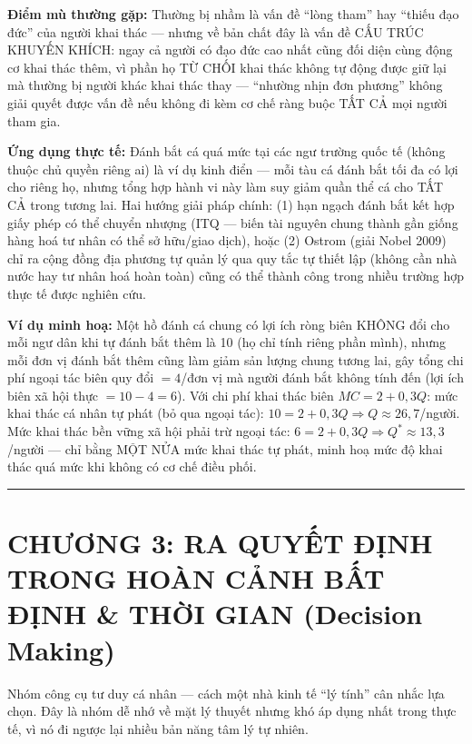 \documentclass[
]{article}
\begin{document}
\textbf{Điểm mù thường gặp:} Thường bị nhầm là vấn đề ``lòng tham'' hay
``thiếu đạo đức'' của người khai thác --- nhưng về bản chất đây là vấn
đề CẤU TRÚC KHUYẾN KHÍCH: ngay cả người có đạo đức cao nhất cũng đối
diện cùng động cơ khai thác thêm, vì phần họ TỪ CHỐI khai thác không tự
động được giữ lại mà thường bị người khác khai thác thay --- ``nhường
nhịn đơn phương'' không giải quyết được vấn đề nếu không đi kèm cơ chế
ràng buộc TẤT CẢ mọi người tham gia.

\textbf{Ứng dụng thực tế:} Đánh bắt cá quá mức tại các ngư trường quốc
tế (không thuộc chủ quyền riêng ai) là ví dụ kinh điển --- mỗi tàu cá
đánh bắt tối đa có lợi cho riêng họ, nhưng tổng hợp hành vi này làm suy
giảm quần thể cá cho TẤT CẢ trong tương lai. Hai hướng giải pháp chính:
(1) hạn ngạch đánh bắt kết hợp giấy phép có thể chuyển nhượng (ITQ ---
biến tài nguyên chung thành gần giống hàng hoá tư nhân có thể sở
hữu/giao dịch), hoặc (2) Ostrom (giải Nobel 2009) chỉ ra cộng đồng địa
phương tự quản lý qua quy tắc tự thiết lập (không cần nhà nước hay tư
nhân hoá hoàn toàn) cũng có thể thành công trong nhiều trường hợp thực
tế được nghiên cứu.

\textbf{Ví dụ minh hoạ:} Một hồ đánh cá chung có lợi ích ròng biên KHÔNG
đổi cho mỗi ngư dân khi tự đánh bắt thêm là 10 (họ chỉ tính riêng phần
mình), nhưng mỗi đơn vị đánh bắt thêm cũng làm giảm sản lượng chung
tương lai, gây tổng chi phí ngoại tác biên quy đổi \(= 4\)/đơn vị mà
người đánh bắt không tính đến (lợi ích biên xã hội thực
\(= 10 - 4 = 6\)). Với chi phí khai thác biên \(MC = 2 + 0{,}3Q\): mức
khai thác cá nhân tự phát (bỏ qua ngoại tác):
\(10 = 2 + 0{,}3Q \Rightarrow Q \approx 26{,}7\)/người. Mức khai thác
bền vững xã hội phải trừ ngoại tác:
\(6 = 2 + 0{,}3Q \Rightarrow Q^* \approx 13{,}3\)/người --- chỉ bằng MỘT
NỬA mức khai thác tự phát, minh hoạ mức độ khai thác quá mức khi không
có cơ chế điều phối.

\begin{center}\rule{0.5\linewidth}{0.5pt}\end{center}

\section{CHƯƠNG 3: RA QUYẾT ĐỊNH TRONG HOÀN CẢNH BẤT ĐỊNH \& THỜI GIAN
(Decision
Making)}\label{chux1b0ux1a1ng-3-ra-quyux1ebft-ux111ux1ecbnh-trong-houxe0n-cux1ea3nh-bux1ea5t-ux111ux1ecbnh-thux1eddi-gian-decision-making}

Nhóm công cụ tư duy cá nhân --- cách một nhà kinh tế ``lý tính'' cân
nhắc lựa chọn. Đây là nhóm dễ nhớ về mặt lý thuyết nhưng khó áp dụng
nhất trong thực tế, vì nó đi ngược lại nhiều bản năng tâm lý tự nhiên.
\end{document}
